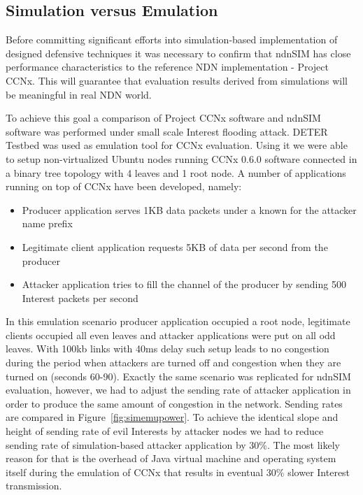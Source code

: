 \subsection{Simulation versus Emulation}
\label{sec:simemu}
Before committing significant efforts into simulation-based implementation of designed defensive techniques it was necessary to confirm that ndnSIM has close performance characteristics to the reference NDN implementation - Project CCNx. This will guarantee that evaluation results derived from simulations will be meaningful in real NDN world.

To achieve this goal a comparison of Project CCNx software and ndnSIM software was performed under small scale Interest flooding attack. DETER Testbed was used as emulation tool for CCNx evaluation. Using it we were able to setup non-virtualized Ubuntu nodes running CCNx 0.6.0 software connected in a binary tree topology with 4 leaves and 1 root node. A number of applications running on top of CCNx have been developed, namely:
\begin{itemize}
\item{Producer application serves 1KB data packets under a known for the attacker name prefix}
\item{Legitimate client application requests 5KB of data per second from the producer}
\item{Attacker application tries to fill the channel of the producer by sending 500 Interest packets per second}
\end{itemize} 

In this emulation scenario producer application occupied a root node, legitimate clients occupied all even leaves and attacker applications were put on all odd leaves. With 100kb links with 40ms delay such setup leads to no congestion during the period when attackers are turned off and congestion when they are turned on (seconds 60-90). Exactly the same scenario was replicated for ndnSIM evaluation, however, we had to adjust the sending rate of attacker application in order to produce the same amount of congestion in the network. Sending rates are compared in Figure~\ref{fig:simemupower}. To achieve the identical slope and height of sending rate of evil Interests by attacker nodes we had to reduce sending rate of simulation-based attacker application by 30\%. The most likely reason for that is the overhead of Java virtual machine and operating system itself during the emulation of CCNx that results in eventual 30\% slower Interest transmission.  


